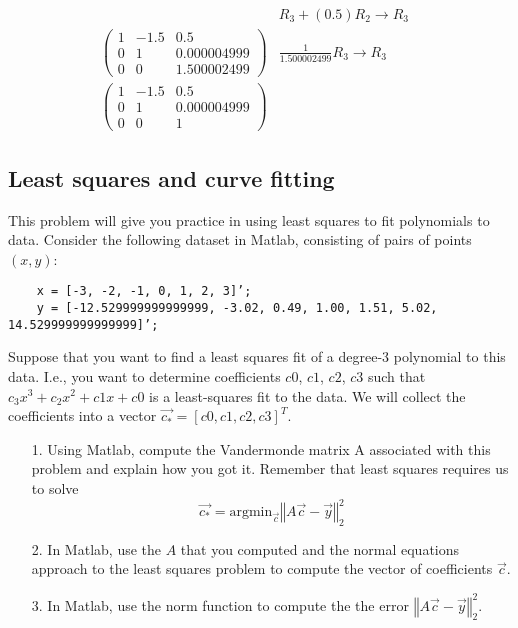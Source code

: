 \documentclass{article}
\begin{document}
\begin{itemize}
\begin{align*}
        & R_3 + (0.5)R_2\rightarrow R_3 & \\
        \begin{pmatrix} 1 & -1.5 & 0.5 \\ 0 & 1 & 0.000004999 \\ 0 & 0 & 1.500002499 \end{pmatrix}
        & \frac{1}{1.500002499}R_3\rightarrow R_3 \\
        \begin{pmatrix} 1 & -1.5 & 0.5 \\ 0 & 1 & 0.000004999 \\ 0 & 0 & 1 \end{pmatrix}
    \end{align*}
\end{itemize}

\newpage
\subsection{Least squares and curve fitting}
This problem will give you practice in using least squares to fit polynomials to data. Consider the following dataset in Matlab, consisting of pairs of points $(x, y)$:
\begin{verbatim}
    x = [-3, -2, -1, 0, 1, 2, 3]’;
    y = [-12.529999999999999, -3.02, 0.49, 1.00, 1.51, 5.02, 14.529999999999999]’;
\end{verbatim}
Suppose that you want to find a least squares fit of a degree-3 polynomial to this data. I.e., you want to determine coefficients $c0$, $c1$, $c2$, $c3$ such that $c_3x^3 + c_2x^2 + c1x + c0$ is a least-squares fit to the data. We will collect the coefficients into a vector $\overrightarrow{c_*} = [c0, c1, c2, c3]^T$.
\begin{itemize}
    \item[1.] Using Matlab, compute the Vandermonde matrix A associated with this problem and explain how you got it. Remember that least squares requires us to solve
    \[\overrightarrow{c_*} = \text{argmin}_{\overrightarrow{c}}\left\Vert A\overrightarrow{c}-\overrightarrow{y}\right\Vert^2_2\]
    \newline\newline
    
    
    
    \item[2.] In Matlab, use the $A$ that you computed and the normal equations approach to the least squares problem to compute the vector of coefficients $\overrightarrow{c}$.
    \item[3.] In Matlab, use the norm function to compute the the error $\left\Vert A\overrightarrow{c}-\overrightarrow{y}\right\Vert^2_2$.
\end{itemize}
\end{document}
